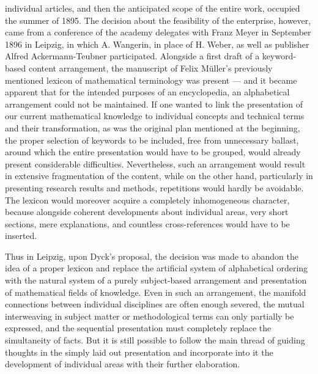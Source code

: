 \thispagestyle{fancy}

\vspace{0.5cm}

individual articles, and then the anticipated scope of the entire work, occupied the summer of 1895. The decision about the feasibility of the enterprise, however, came from a conference of the academy delegates with Franz Meyer in September 1896 in Leipzig, in which A. Wangerin, in place of H. Weber, as well as publisher Alfred Ackermann-Teubner participated. Alongside a first draft of a keyword-based content arrangement, the manuscript of Felix Müller's previously mentioned lexicon of mathematical terminology was present — and it became apparent that for the intended purposes of an encyclopedia, an alphabetical arrangement could not be maintained. If one wanted to link the presentation of our current mathematical knowledge to individual concepts and technical terms and their transformation, as was the original plan mentioned at the beginning, the proper selection of keywords to be included, free from unnecessary ballast, around which the entire presentation would have to be grouped, would already present considerable difficulties. Nevertheless, such an arrangement would result in extensive fragmentation of the content, while on the other hand, particularly in presenting research results and methods, repetitions would hardly be avoidable. The lexicon would moreover acquire a completely inhomogeneous character, because alongside coherent developments about individual areas, very short sections, mere explanations, and countless cross-references would have to be inserted. 

Thus in Leipzig, upon Dyck's proposal, the decision was made to abandon the idea of a proper lexicon and replace the artificial system of alphabetical ordering with the natural system of a purely subject-based arrangement and presentation of mathematical fields of knowledge. Even in such an arrangement, the manifold connections between individual disciplines are often enough severed, the mutual interweaving in subject matter or methodological terms can only partially be expressed, and the sequential presentation must completely replace the simultaneity of facts. But it is still possible to follow the main thread of guiding thoughts in the simply laid out presentation and incorporate into it the development of individual areas with their further elaboration.
